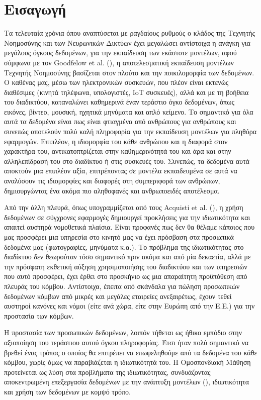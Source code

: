 \chapter{Εισαγωγή}

Τα τελευταία χρόνια όπου αναπτύσεται με ραγδαίους ρυθμούς ο κλάδος της Τεχνητής Νοημοσύνης και των Νευρωνικών Δικτύων έχει μεγαλώσει αντίστοιχα η ανάγκη για μεγάλους όγκους δεδομένων, για την εκπαίδευση των εκάστοτε μοντέλων, αφού σύμφωνα με τον Goodfelow et al. (), η αποτελεσματική εκπαίδευση μοντέλων Τεχνητής Νοημοσύνης βασίζεται στον πλούτο και την ποικιλομορφία των δεδομένων. Ο καθένας μας, μέσω των ηλεκτρονικών συσκευών, που πλέον είναι εκτενώς διαθέσιμες (κινητά τηλέφωνα, υπολογιστές, IoT συσκευές), αλλά και με τη βοήθεια του διαδικτύου, καταναλώνει καθημερινά έναν τεράστιο όγκο δεδομένων, όπως εικόνες, βίντεο, μουσική, ηχητικά μηνύματα και απλό κείμενο. Το σημαντικό για όλα αυτά τα δεδομένα είναι πως είναι φτιαγμένα από ανθρώπους για ανθρώπους και συνεπώς αποτελούν πολύ καλή πληροφορία για την εκπαίδευση μοντέλων για πληθόρα εφαρμογών. Επιπλέον, η ιδιομορφία του κάθε ανθρώπου και η διαφορά στον χαρακτήρα του, αντικατοπτρίζεται στην καθημερινότητά του και άρα και στην αλληλεπίδρασή του στο διαδίκτυο ή στις συσκευές του. Συνεπώς, τα δεδομένα αυτά αποκτούν μια επιπλέον αξία, επιτρέποντας σε μοντέλα εκπαιδευμένα σε αυτά να αναλύσουν τις ιδιομορφίες και διαφορές στη συμπεριφορά των ανθρώπων, δημιουργώντας ένα ακόμα πιο αληθοφανές και ανθρωποειδές αποτέλεσμα. 

Από την άλλη πλευρά, όπως υπογραμμίζεται από τους Acquisti et al. (), η χρήση δεδομένων σε σύγχρονες εφαρμογές δημιουργεί προκλήσεις για την ιδιωτικότητα και απαιτεί αυστηρά νομοθετικά πλαίσια. Είναι προφανές πως δεν θα θέλαμε κάποιος που μας προσφέρει μια υπηρεσία στο κινητό μας να έχει πρόσβαση στα προσωπικά δεδομένα μας (φωτογραφίες, μηνύματα κ.α.). Το πρόβλημα της ιδιωτικότητας στο διαδίκτυο δεν θεωρούταν τόσο σημαντικό πριν ακόμα και από μία δεκαετία, αλλά με την πρόσφατη εκθετική αύξηση χρησιμοποιήσης του διαδικτύου και των υπηρεσιών που αυτό προσφέρει, έχει έρθει στο προσκήνιο ως μια απαραίτητη προϋπόθεση από πλευράς του κόμβου. Αντίστοιχα, έπειτα από σκάνδαλα για πώληση προσωπικών δεδομένων κόμβων από μικρές και μεγάλες εταιρείες ανεξαιρέτως, έχουν τεθεί αυστηροί κανόνες και νόμοι (είτε ανά χώρα, είτε στην Ευρώπη από την Ε.Ε.) για την προστασία των κόμβων.

Η προστασία των προσωπικών δεδομένων, λοιπόν τήθεται ως ήθικο εμπόδιο στην αξιοποίηση του τεράστιου αυτού όγκου πληροφορίας. Έτσι ήταν πολύ σημαντικό να βρεθεί ένας τρόπος ο οποίος θα επιτρέπει να επωφεληθούμε από τα δεδομένα του κάθε κόμβου, χωρίς όμως να παραβιάζεται η ιδιωτικότητά του. Η Ομοσπονδιακή Μάθηση προτείνεται ως λύση στα προβλήματα της ιδιωτικότητας, συνδυάζοντας αποκεντρωμένη επεξεργασία δεδομένων με την ανάπτυξη μοντέλων (), ιδιωτικότητα και χρήση των δεδομένων με κομψό τρόπο.

